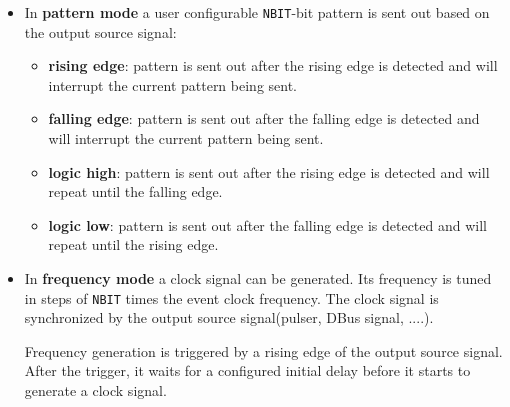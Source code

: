 \documentclass[12pt,a4paper]{article}
\begin{document}
\begin{itemize}
\item 
	In \textbf{pattern mode} a user configurable \texttt{NBIT}-bit pattern is sent out based on the output source signal:
	
	\begin{itemize}
		\item
		  \textbf{rising edge}: pattern is sent out
		  after the rising edge is detected and will interrupt the current
		  pattern being sent.
		\item
		  \textbf{falling edge}: pattern is sent out
		  after the falling edge is detected and will interrupt the current
		  pattern being sent.
		\item
		  \textbf{logic high}: pattern is sent out after
		  the rising edge is detected and will repeat until the falling edge.
		\item
		  \textbf{logic low}: pattern is sent out after
		  the falling edge is detected and will repeat until the rising edge.
		\end{itemize}
	
\item 
	In \textbf{frequency mode} a clock signal can be generated. Its frequency is tuned in steps of \texttt{NBIT} times the event clock frequency.  The clock signal is synchronized by the output source signal(pulser, DBus signal, ....). 
	
	Frequency generation is triggered by a rising edge of the output source signal. After the trigger, it waits for a configured initial delay before it starts to generate a clock signal. 
		

\end{itemize}
\end{document}
